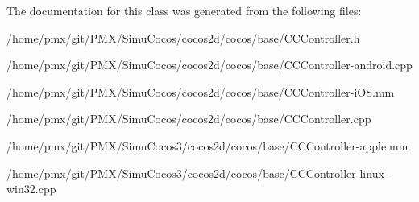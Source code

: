 The documentation for this class was generated from the following files\+:\begin{DoxyCompactItemize}
\item 
/home/pmx/git/\+P\+M\+X/\+Simu\+Cocos/cocos2d/cocos/base/C\+C\+Controller.\+h\item 
/home/pmx/git/\+P\+M\+X/\+Simu\+Cocos/cocos2d/cocos/base/C\+C\+Controller-\/android.\+cpp\item 
/home/pmx/git/\+P\+M\+X/\+Simu\+Cocos/cocos2d/cocos/base/C\+C\+Controller-\/i\+O\+S.\+mm\item 
/home/pmx/git/\+P\+M\+X/\+Simu\+Cocos/cocos2d/cocos/base/C\+C\+Controller.\+cpp\item 
/home/pmx/git/\+P\+M\+X/\+Simu\+Cocos3/cocos2d/cocos/base/C\+C\+Controller-\/apple.\+mm\item 
/home/pmx/git/\+P\+M\+X/\+Simu\+Cocos3/cocos2d/cocos/base/C\+C\+Controller-\/linux-\/win32.\+cpp\end{DoxyCompactItemize}
